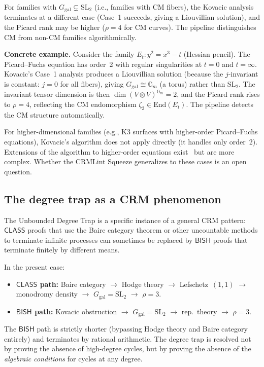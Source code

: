 \documentclass[11pt]{article}
\theoremstyle{plain}
\theoremstyle{definition}
\theoremstyle{remark}
\newcommand{\SL}{\mathrm{SL}}
\newcommand{\End}{\mathrm{End}}
\newcommand{\Ggal}{G_{\mathrm{gal}}}
\newcommand{\BISH}{\mathsf{BISH}}
\newcommand{\CLASS}{\mathsf{CLASS}}
\begin{document}
For families with $\Ggal \subsetneq \SL_2$ (i.e., families with CM fibers), the Kovacic analysis terminates at a different case (Case~1 succeeds, giving a Liouvillian solution), and the Picard rank may be higher ($\rho = 4$ for CM curves).
The pipeline distinguishes CM from non-CM families algorithmically.

\textbf{Concrete example.}
Consider the family $E_t : y^2 = x^3 - t$ (Hessian pencil).
The Picard--Fuchs equation has order~2 with regular singularities at $t = 0$ and $t = \infty$.
Kovacic's Case~1 analysis produces a Liouvillian solution (because the $j$-invariant is constant: $j = 0$ for all fibers), giving $\Ggal \cong \mathbb{G}_m$ (a torus) rather than $\SL_2$.
The invariant tensor dimension is then $\dim(V \otimes V)^{\mathbb{G}_m} = 2$, and the Picard rank rises to $\rho = 4$, reflecting the CM endomorphism $\zeta_3 \in \End(E_t)$.
The pipeline detects the CM structure automatically.

For higher-dimensional families (e.g., K3 surfaces with higher-order Picard--Fuchs equations), Kovacic's algorithm does not apply directly (it handles only order~2).
Extensions of the algorithm to higher-order equations exist~\cite{Singer2009} but are more complex.
Whether the CRMLint Squeeze generalizes to these cases is an open question.

\subsection{The degree trap as a CRM phenomenon}

The Unbounded Degree Trap is a specific instance of a general CRM pattern: $\CLASS$ proofs that use the Baire category theorem or other uncountable methods to terminate infinite processes can sometimes be replaced by $\BISH$ proofs that terminate finitely by different means.

In the present case:
\begin{itemize}
  \item \textbf{$\CLASS$ path:} Baire category $\to$ Hodge theory $\to$ Lefschetz~$(1,1)$ $\to$ monodromy density $\to$ $\Ggal = \SL_2$ $\to$ $\rho = 3$.
  \item \textbf{$\BISH$ path:} Kovacic obstruction $\to$ $\Ggal = \SL_2$ $\to$ rep.\ theory $\to$ $\rho = 3$.
\end{itemize}
The $\BISH$ path is strictly shorter (bypassing Hodge theory and Baire category entirely) and terminates by rational arithmetic.
The degree trap is resolved not by proving the absence of high-degree cycles, but by proving the absence of the \emph{algebraic conditions} for cycles at any degree.
\end{document}
